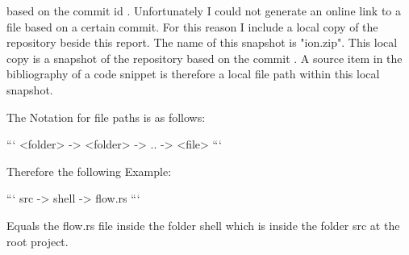based on the commit id \commitid.
Unfortunately I could not generate an online link to a file based on a certain commit.
For this reason I include a local copy of the repository beside this report.
The name of this snapshot is "ion.zip".
This local copy is a snapshot of the repository based on the commit \commitid.
A source item in the bibliography of a code snippet is therefore a local file path within this local snapshot.

The Notation for file paths is as follows:

```
<folder> -> <folder> -> .. -> <file>
```

Therefore the following Example:

```
src -> shell -> flow.rs
```

Equals the flow.rs file inside the folder shell which is inside the folder src at the root project.

